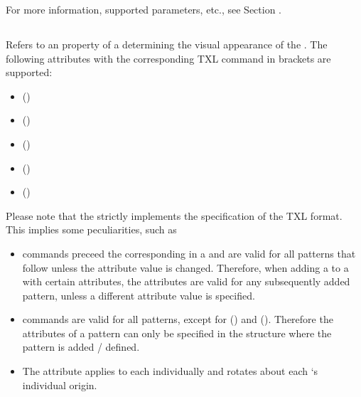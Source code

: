\documentclass[letterpaper,10pt,english]{sphinxmanual}
\begin{document}
For more information, supported parameters, etc., see Section {\hyperref[Chapters/40_PythonModuleReference:pythonmodulereferencepatterns]{}}.


\subsection{}
\label{Chapters/10_Introduction:attribute}
Refers to an property of a  determining the visual appearance of the .
The following attributes with the corresponding TXL command in brackets are supported:
\begin{itemize}
\item {} 
 ()

\item {} 
 ()

\item {} 
 ()

\item {} 
 ()

\item {} 
 ()

\end{itemize}

Please note that the  strictly implements the specification of the TXL format.
This implies some peculiarities, such as
\begin{itemize}
\item {} 
 commands preceed the corresponding  in a  and are valid for all patterns that follow
unless the attribute value is changed. Therefore, when adding a  to a  with certain attributes,
the attributes are valid for any subsequently added pattern, unless a different attribute value is specified.

\item {} 
 commands are valid for all patterns, except for  () and  ().
Therefore the attributes of a pattern can only be specified in the structure where the pattern is added / defined.

\item {} 
The  attribute applies to each  individually and rotates about each `s individual origin.

\end{itemize}
\end{document}
